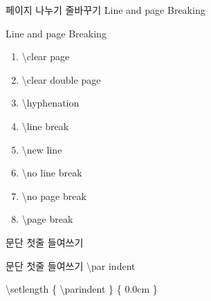 \documentclass[ aspectratio=149,  10pt,blue,xcolor=pdftex,dvipsnames,table,handout,notes]{beamer}
\begin{document}


		\begin{frame}[t]{페이지 나누기 줄바꾸기 Line and page Breaking}

			\begin{block} {Line and page Breaking}
			\begin{enumerate}
			\item	\textbackslash clear page
			\item	\textbackslash clear double page
			\item	\textbackslash hyphenation
			\item	\textbackslash line break
			\item	\textbackslash new line
			\item	\textbackslash no line break
			\item	\textbackslash no page break
			\item	\textbackslash page break
			\end{enumerate}
			\end{block}

		\note[item]{}
		\end{frame}

		\begin{frame}[t]{문단 첫줄 들여쓰기}

			\begin{block} {문단 첫줄 들여쓰기}
			\textbackslash par indent
			\end{block}

			\begin{example}
			\textbackslash setlength \{ \textbackslash parindent \} \{ 0.0cm \}\\
			\end{example}

		\note[item]{}
		\end{frame}
\end{document}
